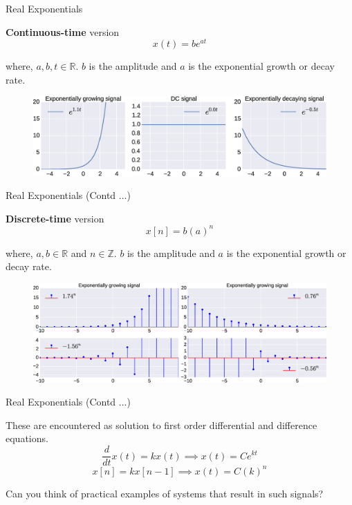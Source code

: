 \documentclass[aspectratio=169]{beamer}
\begin{document}
\begin{frame}{Real Exponentials}

\textbf{Continuous-time} version
\[ x(t) = be^{at} \]

where, $a, b, t \in \mathbb{R}$. $b$ is the amplitude and $a$ is the exponential growth or decay rate.

\begin{figure}
\includegraphics[width=\textwidth]{img/exp.eps}
\end{figure}
\end{frame}



\begin{frame}[t]
\end{frame}


\begin{frame}{Real Exponentials (Contd ...)}

\textbf{Discrete-time} version
\[ x[n] =  b \left(a\right)^n \]

where, $a, b \in \mathbb{R}$ and $n \in \mathbb{Z}$. $b$ is the amplitude and $a$ is the exponential growth or decay rate.

\begin{figure}
\includegraphics[width=\textwidth]{img/disc_exp.eps}
\end{figure}
\end{frame}



\begin{frame}[t]
\end{frame}


\begin{frame}{Real Exponentials (Contd ...)}

These are encountered as solution to first order differential and difference equations.
\[ \frac{d}{dt}x(t) = kx(t) \implies x(t) = Ce^{kt} \]
\[ x[n] = kx[n-1] \implies x(t) = C(k)^n \]

Can you think of practical examples of systems that result in such signals?
\end{frame}
\end{document}
